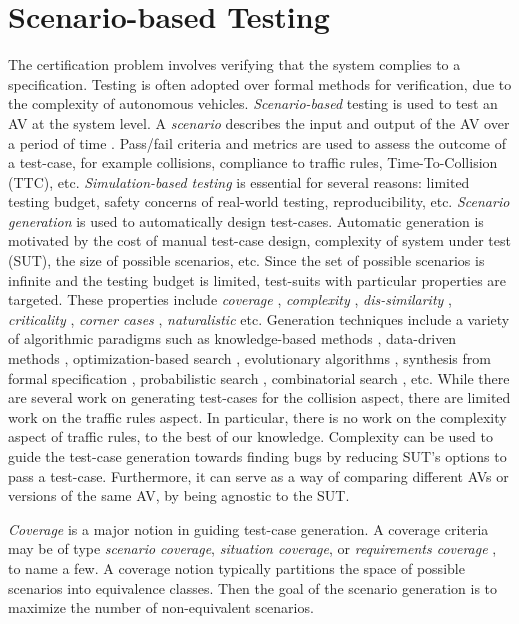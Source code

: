 \section{Scenario-based Testing}

The certification problem involves verifying that the system complies to a specification.
%
Testing is often adopted over formal methods for verification, due to the complexity of autonomous vehicles.
%
\emph{Scenario-based} testing \cite{Riedmaier.2020} is used to test an AV at the system level.
%
A \emph{scenario} describes the input and output of the AV over a period of time \cite{Ulbrich.2015}.
%
Pass/fail criteria and metrics are used to assess the outcome of a test-case, for example collisions,  compliance to traffic rules, Time-To-Collision (TTC), etc.
%
\emph{Simulation-based testing} \cite{Abdessalem.2018:feature,Abdessalem.2018:vision,Abeysirigoonawardena.2019,Abdessalem.2016,Ding.2020,Gambi.2019,Norden.2019} is essential for several reasons: limited testing budget, safety concerns of real-world testing, reproducibility, etc.
%
\emph{Scenario generation} is used to automatically design test-cases.
%
Automatic generation is motivated by the cost of manual test-case design, complexity of system under test (SUT), the size of possible scenarios, etc.
%
Since the set of possible scenarios is infinite and the testing budget is limited, test-suits with particular properties are targeted.
%
These properties include \emph{coverage} \cite{Sheikhi.2022}, \emph{complexity} \cite{Gao.2019,Xia.2017,Xia.2018,Wang.2018},
 \emph{dis-similarity} \cite{Harder.2021}, \emph{criticality} \cite{Klischat.2019,Zhong.2021}, \emph{corner cases} \cite{OKelly.2018}, \emph{naturalistic} \cite{Akagi.2019}
 etc.
%
Generation techniques include a variety of algorithmic paradigms such as  knowledge-based methods \cite{Li.2020}, data-driven methods \cite{OKelly.2018}, optimization-based search \cite{Klischat.2020,Feng_Methodology.2020,Feng_CaseStudies.2020}, evolutionary algorithms \cite{Klischat.2019,Calo.2020,Zhong.2021,Sheikhi.2022}, synthesis from formal specification \cite{Klischat.2020,Tuncali.2019}, probabilistic search \cite{Fremont_testing.2020,Tuncali.2016}, combinatorial search \cite{Tuncali.2019,Gao.2019,Xia.2018}, etc.
%
While there are several work on generating test-cases for the collision aspect, there are limited work on the traffic rules aspect.
%
In particular, there is no work on the complexity aspect of traffic rules, to the best of our knowledge.
%
Complexity can be used to guide the test-case generation towards finding bugs by reducing SUT's options to pass a test-case.
%
Furthermore, it can serve as a way of comparing different AVs or versions of the same AV, by being agnostic to the SUT.


\emph{Coverage} \cite{Tahir.2020,Tahir.2022,Xia.2018,Hawkins.2019,Majzik.2019,Tang.2021} is a major notion in guiding test-case generation.
%
A coverage criteria may be of type \emph{scenario coverage}, \emph{situation coverage}, or \emph{requirements coverage} \cite{Tahir.2020}, to name a few.
%
A coverage notion typically partitions the space of possible scenarios into equivalence classes.
%
Then the goal of the scenario generation is to maximize the number of non-equivalent scenarios.
